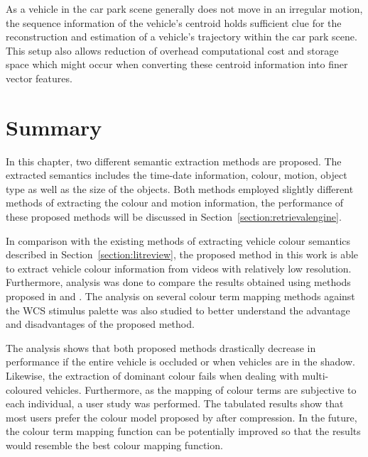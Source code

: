 As a vehicle in the car park scene generally does not move in an irregular motion, the sequence information of the vehicle's centroid holds sufficient clue for the reconstruction and estimation of a vehicle's trajectory within the car park scene. This setup also allows reduction of overhead computational cost and storage space which might occur when converting these centroid information into finer vector features.

\section{Summary}
In this chapter, two different semantic extraction methods are proposed. The extracted semantics includes the time-date information, colour, motion, object type as well as the size of the objects. Both methods employed slightly different methods of extracting the colour and motion information, the performance of these proposed methods will be discussed in Section~\ref{section:retrievalengine}.

In comparison with the existing methods of extracting vehicle colour semantics described in Section~\ref{section:litreview}, the proposed method in this work is able to extract vehicle colour information from videos with relatively low resolution.
Furthermore, analysis was done to compare the results obtained using methods proposed in \versionOneExt and \versionTwoExt. The analysis on several colour term mapping methods against the WCS stimulus palette was also studied to better understand the advantage and disadvantages of the proposed method.

The analysis shows that both proposed methods drastically decrease in performance if the entire vehicle is occluded or when vehicles are in the shadow. Likewise, the extraction of dominant colour fails when dealing with multi-coloured vehicles.
Furthermore, as the mapping of colour terms are subjective to each individual, a user study was performed. The tabulated results show that most users prefer the colour model proposed by  after compression.
In the future, the colour term mapping function can be potentially improved so that the results would resemble the best colour mapping function.

